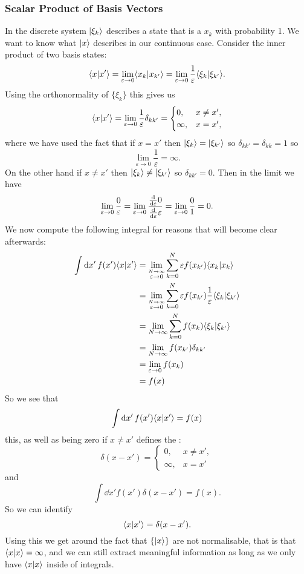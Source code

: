     \subsubsection{Scalar Product of Basis Vectors}
    In the discrete system \(\vert {\xi_k} \rangle\) describes a state that is a \(x_k\) with probability 1.
    We want to know what \(\vert {x} \rangle\) describes in our continuous case.
    Consider the inner product of two basis states:
    \[\langle {x} \vert {x'} \rangle = \lim_{\varepsilon\to 0}\langle {x_k} \vert {x_{k'}} \rangle = \lim_{\varepsilon\to 0} \frac{1}{\varepsilon}\langle {\xi_k} \vert {\xi_{k'}} \rangle.\]
    Using the orthonormality of \(\{\xi_k\}\) this gives us
    \[
        \langle {x} \vert {x'} \rangle = \lim_{\varepsilon\to 0}\frac{1}{\varepsilon}\delta_{kk'} =
        \begin{cases}
            0, & x \ne x',\\
            \infty, &x = x',
        \end{cases}
    \]
    where we have used the fact that if \(x = x'\) then \(\vert {\xi_k} \rangle = \vert {\xi_{k'}} \rangle\) so \(\delta_{kk'} = \delta_{kk} = 1\) so
    \[\lim_{\varepsilon\to 0} \frac{1}{\varepsilon} = \infty.\]
    On the other hand if \(x \ne x'\) then \(\vert {\xi_k} \rangle\ne\vert {\xi_{k'}} \rangle\) so \(\delta_{kk'} = 0\).
    Then in the limit we have
    \[\lim_{\varepsilon\to 0}\frac{0}{\varepsilon} = \lim_{\varepsilon\to 0}\frac{\dv{\varepsilon}0}{\dv{\varepsilon}\varepsilon} = \lim_{\varepsilon\to 0}\frac{0}{1} = 0.\]
    We now compute the following integral for reasons that will become clear afterwards:
    \begin{align*}
        \int\dd{x'} f(x')\langle {x} \vert {x'} \rangle &= \lim_{\stackrel{N\to \infty}{\varepsilon\to 0}}\sum_{k=0}^{N} \varepsilon f(x_{k'})\langle {x_k} \vert {x_k} \rangle\\
        &= \lim_{\stackrel{N\to \infty}{\varepsilon\to 0}}\sum_{k=0}^{N} \varepsilon f(x_{k'})\frac{1}{\varepsilon}\langle {\xi_{k}} \vert {\xi_{k'}} \rangle\\
        &= \lim_{N\to\infty}\sum_{k=0}^{N}  f(x_k)\langle {\xi_{k}} \vert {\xi_{k'}} \rangle\\
        &= \lim_{N\to\infty} f(x_{k'})\delta_{kk'}\\
        &= \lim_{\varepsilon\to 0}f(x_{k})\\
        &= f(x)
    \end{align*}
    So we see that
    \[\int\dd{x'}f(x')\langle {x} \vert {x'} \rangle = f(x)\]
    this, as well as being zero if \(x \ne x'\) defines the :
    \[
        \delta(x - x') =
        \begin{cases}
            0, & x\ne x',\\
            \infty, & x = x'
        \end{cases}
    \]
    and
    \[\int\dd{x'}f(x')\delta(x - x') = f(x).\]
    So we can identify
    \[\langle {x} \vert {x'} \rangle = \delta(x - x').\]
    Using this we get around the fact that \(\{\vert {x} \rangle\}\) are not normalisable, that is that \(\langle {x} \vert {x} \rangle = \infty\), and we can still extract meaningful information as long as we only have \(\langle {x} \vert {x} \rangle\) inside of integrals.
    
    